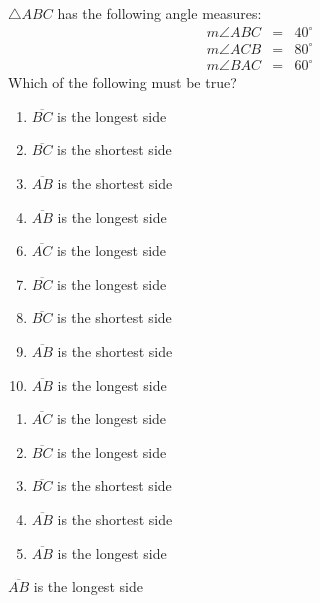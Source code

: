 

 $\triangle ABC$ has the following angle measures:
\[\begin{array}{ccc}m\angle ABC &=& 40^\circ\\ 
m\angle ACB &=& 80^\circ\\
m\angle BAC &=& 60^\circ
\end{array}\]
Which of the following must be true?


\ifsat
	\begin{enumerate}[label=\Alph*)]
		\item  $\overline{BC}$ is the longest side 
		\item  $\overline{BC}$ is the shortest side
		\item  $\overline{AB}$ is the shortest side
		\item  $\overline{AB}$ is the longest side%
	\end{enumerate}
\else
\fi

\ifacteven
	\begin{enumerate}[label=\textbf{\Alph*.},itemsep=\fill,align=left]
		\setcounter{enumii}{5}
		\item  $\overline{AC}$ is the longest side
		\item  $\overline{BC}$ is the longest side 
		\item  $\overline{BC}$ is the shortest side
		\addtocounter{enumii}{1}
		\item  $\overline{AB}$ is the shortest side
		\item  $\overline{AB}$ is the longest side%
	\end{enumerate}
\else
\fi

\ifactodd
	\begin{enumerate}[label=\textbf{\Alph*.},itemsep=\fill,align=left]
		\item  $\overline{AC}$ is the longest side
		\item  $\overline{BC}$ is the longest side 
		\item  $\overline{BC}$ is the shortest side
		\item  $\overline{AB}$ is the shortest side
		\item  $\overline{AB}$ is the longest side%
	\end{enumerate}
\else
\fi

\ifgridin
  $\overline{AB}$ is the longest side%

\else
\fi

